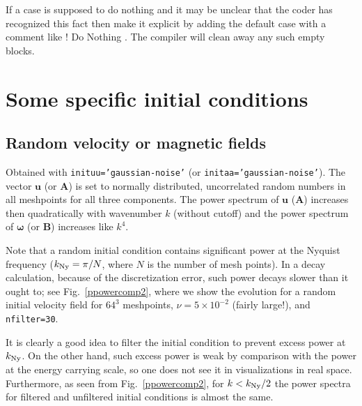 \documentclass[\mydriver,12pt,twoside,notitlepage,a4paper]{article}
\newcommand{\code}[1]{\texttt{#1}}
\newcommand{\vekt}[1] {\mathbf{#1}}
\newcommand{\Av}            {\vekt{A}}
\newcommand{\Bv}            {\vekt{B}}
\newcommand{\uv}            {\vekt{u}}
\newcommand{\omv}           {\boldsymbol{\omega}}
\begin{document}
If a case is supposed to do nothing and it may be unclear that the
coder has recognized this fact then make it explicit by adding the 
default case with a comment like  ! Do Nothing  .   
The compiler will clean away any such empty blocks.



\section{Some specific initial conditions}

\subsection{Random velocity or magnetic fields}

Obtained with \code{inituu='gaussian-noise'}
(or \code{initaa='gaussian-noise'}).
The vector $\uv$ (or $\Av$) is set to normally distributed, uncorrelated random
numbers in all meshpoints for all three components.
The power spectrum of
$\uv$ ($\Av$) increases then quadratically with wavenumber $k$ (without cutoff)
and the power spectrum of $\omv$ (or $\Bv$) increases like $k^4$.

Note that a random initial condition contains significant power at the
Nyquist frequency ($k_{\rm Ny}=\pi/N$, where $N$ is the number of mesh
points). In a decay calculation, because of the discretization error,
such power decays slower than it ought to; see Fig.~\ref{ppowercomp2},
where we show the evolution for a random initial velocity field for $64^3$
meshpoints, $\nu=5\times10^{-2}$ (fairly large!), and \code{nfilter=30}.

It is clearly a good idea to filter the initial condition to prevent
excess power at $k_{\rm Ny}$. On the other hand, such excess power is
weak by comparison with the power at the energy carrying scale, so one
does not see it in visualizations in real space. Furthermore, as seen
from Fig.~\ref{ppowercomp2}, for $k<k_{\rm Ny}/2$ the power spectra for
filtered and unfiltered initial conditions is almost the same.
\end{document}
